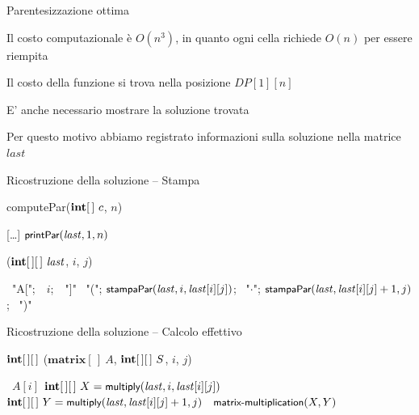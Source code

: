 \begin{frame}{Parentesizzazione ottima}

\BIL
\item Il costo computazionale è $O(n^3)$, in quanto ogni cella richiede $O(n)$ per essere riempita
\item Il costo della funzione si trova nella posizione $DP[1][n]$
\item E' anche necessario mostrare la soluzione trovata
\item Per questo motivo abbiamo registrato informazioni sulla soluzione nella matrice $\mathit{last}$
\EIL

\end{frame}

\begin{frame}{Ricostruzione della soluzione -- Stampa}

\begin{Procedure}
\caption[A]{\textsf{computePar}($\INTARRAY\ c$, \INTEGER $n$)}	
[\ldots]\;
$\textsf{{\small printPar}}(\mathit{last}, 1, n)$\;
\end{Procedure}


\begin{Procedure}
\caption[A]{($\INTARRAY[\,]\ \mathit{last}$, \INTEGER $i$, \INTEGER $j$)}
{ \PRINT\ "A[";\ \PRINT\ $i$;\ \PRINT\ "]"\; }
{
  \PRINT\ "("; 
  $\textsf{{\small stampaPar}}(\mathit{last}, i, \mathit{last}[i][j])$; 
  \PRINT\ "$\cdot$"; 
  $\textsf{{\small stampaPar}}(\mathit{last}, \mathit{last}[i][j]+1, j)$; 
  \PRINT\ ")"\;
}
\end{Procedure}

\end{frame}

\begin{frame}{Ricostruzione della soluzione -- Calcolo effettivo}

\begin{Procedure}
\caption[A]{$\INTARRAY[\,]$ ($\mathbf{matrix}[\,]\ A$, $\INTARRAY[\,]\ S$, \INTEGER $i$, \INTEGER $j$)}
{ \Return\ $A[i]$\; }
{
  $\INTARRAY[\,]\ X = \fontproc{multiply}(\mathit{last}, i, \mathit{last}[i][j])$\;
  $\INTARRAY[\,]\ Y = \fontproc{multiply}(\mathit{last}, \mathit{last}[i][j]+1, j)$\;
  \Return\ $\textsf{{\small matrix-multiplication}}(X,Y)$\;
}
\end{Procedure}

\end{frame}

